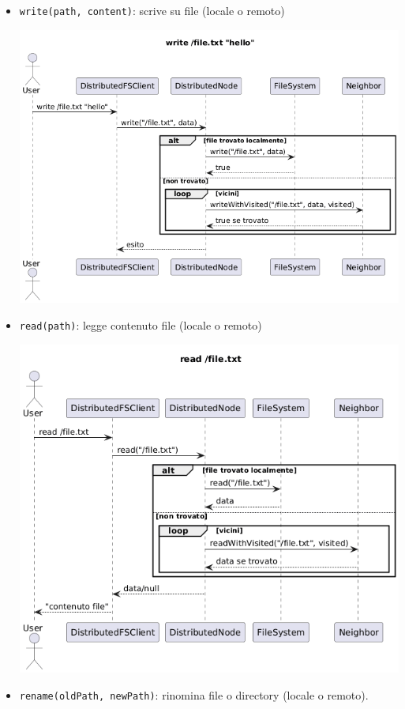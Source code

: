 \documentclass[11pt]{article}
\begin{document}
\begin{itemize}
\item \texttt{write(path, content)}: scrive su file (locale o remoto)
\begin{center}
\includegraphics[width=.9\linewidth]{./img/write.png}
\end{center}
\item \texttt{read(path)}: legge contenuto file (locale o remoto)
\begin{center}
\includegraphics[width=.9\linewidth]{./img/read.png}
\end{center}
\item \texttt{rename(oldPath, newPath)}: rinomina file o directory (locale o remoto).
\begin{center}

\end{center}
\end{itemize}
\end{document}
